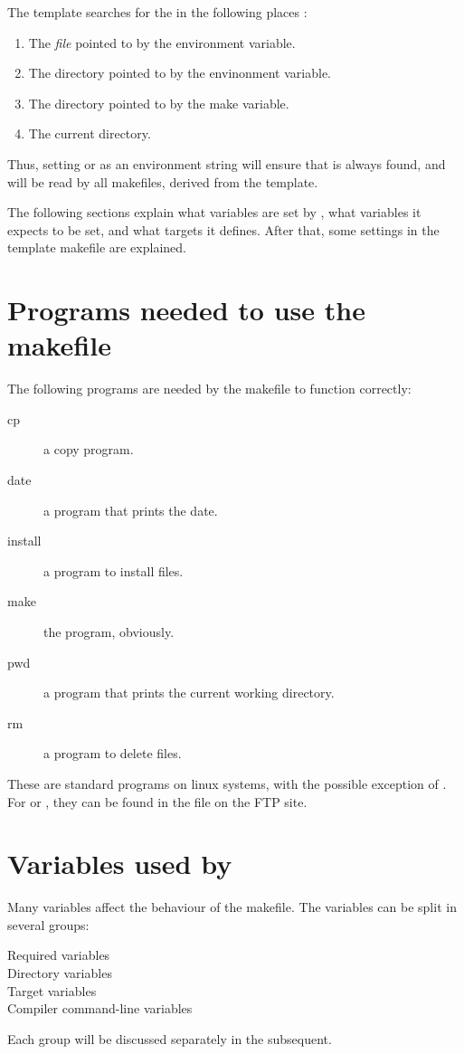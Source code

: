 \documentclass{report}
\begin{document}
The template  searches for the  in  the
following places :
\begin{enumerate}
\item The {\em file} pointed to by the  environment variable.
\item The directory pointed to by the  envinonment variable.
\item The directory pointed to by the  make variable.
\item The current directory.
\end{enumerate}
Thus, setting  or  as an environment string will
ensure that  is always found, and will be read by all
makefiles, derived from the template.

The following sections explain what variables are set by ,
what variables it expects to be set, and what targets it defines. After
that, some settings in the template makefile are explained.

\section{Programs needed to use the makefile}

The following programs are needed by the makefile to function correctly:
\begin{description}
\item[cp] a copy program.
\item[date] a program that prints the date.
\item[install] a program to install files.
\item[make] the  program, obviously.
\item[pwd] a program that prints the current working directory.
\item[rm] a program to delete files.
\end{description}
These are standard programs on linux systems, with the possible exception of
. For \dos or \windowsnt, they can be found in the 
file  on the \fpc FTP site.

\section{Variables used by }

Many variables affect the behaviour of the makefile.  The variables can be
split in several groups:
\begin{description}
\item[Required variables]
\item[Directory variables]
\item[Target variables]
\item[Compiler command-line variables]
\end{description}
Each group will be discussed separately in the subsequent.
\end{document}
